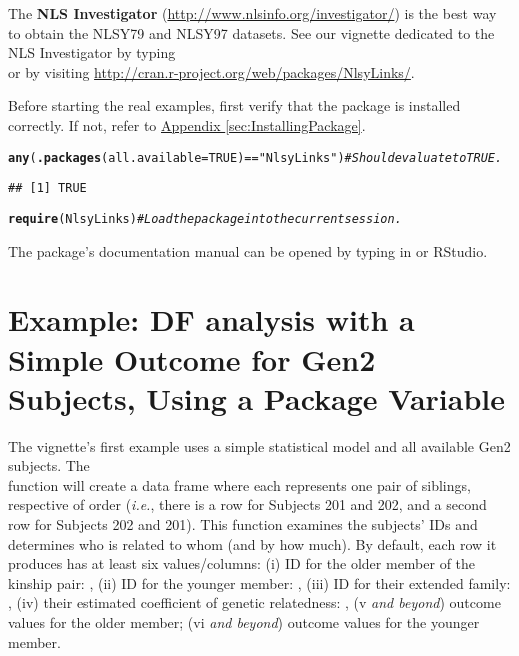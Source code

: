 \documentclass{article}\usepackage[]{graphicx}\usepackage[]{color}
\makeatletter
\newcommand{\hlnum}[1]{\textcolor[rgb]{0.686,0.059,0.569}{#1}}%
\newcommand{\hlstr}[1]{\textcolor[rgb]{0.192,0.494,0.8}{#1}}%
\newcommand{\hlcom}[1]{\textcolor[rgb]{0.678,0.584,0.686}{\textit{#1}}}%
\newcommand{\hlopt}[1]{\textcolor[rgb]{0,0,0}{#1}}%
\newcommand{\hlstd}[1]{\textcolor[rgb]{0.345,0.345,0.345}{#1}}%
\newcommand{\hlkwc}[1]{\textcolor[rgb]{0.333,0.667,0.333}{#1}}%
\newcommand{\hlkwd}[1]{\textcolor[rgb]{0.737,0.353,0.396}{\textbf{#1}}}%
\newenvironment{kframe}{%
 \def\at@end@of@kframe{}%
 \ifinner\ifhmode%
  \def\at@end@of@kframe{\end{minipage}}%
  \begin{minipage}{\columnwidth}%
 \fi\fi%
 \def\FrameCommand##1{\hskip\@totalleftmargin \hskip-\fboxsep
 \colorbox{shadecolor}{##1}\hskip-\fboxsep
     \hskip-\linewidth \hskip-\@totalleftmargin \hskip\columnwidth}%
 \MakeFramed {\advance\hsize-\width
   \@totalleftmargin\z@ \linewidth\hsize
   \@setminipage}}%
 {\par\unskip\endMakeFramed%
 \at@end@of@kframe}
\newenvironment{knitrout}{}{} %
\makeatother
\begin{document}
The \textbf{NLS Investigator}\label{term:NlsInvestigator} (\url{http://www.nlsinfo.org/investigator/}) is the best way to obtain the NLSY79 and NLSY97 datasets.  See our vignette dedicated to the NLS Investigator by typing\\  or by visiting \url{http://cran.r-project.org/web/packages/NlsyLinks/}.

Before starting the real examples, first verify that the  package is installed correctly.  If not, refer to \hyperref[sec:InstallingPackage]{Appendix \ref*{sec:InstallingPackage}}.
\begin{knitrout}
\color{fgcolor}\begin{kframe}
\begin{alltt}
\hlkwd{any}\hlstd{(}\hlkwd{.packages}\hlstd{(}\hlkwc{all.available} \hlstd{=} \hlnum{TRUE}\hlstd{)} \hlopt{==} \hlstr{"NlsyLinks"}\hlstd{)}  \hlcom{#Should evaluate to TRUE.}
\end{alltt}
\begin{verbatim}
## [1] TRUE
\end{verbatim}
\begin{alltt}
\hlkwd{require}\hlstd{(NlsyLinks)}  \hlcom{#Load the package into the current session.}
\end{alltt}


{\ttfamily\noindent\itshape\color{messagecolor}{\#\# Loading required package: NlsyLinks}}\end{kframe}
\end{knitrout}

The package's documentation manual can be opened by typing  in
\R{} or RStudio.


\section{Example: DF analysis with a Simple Outcome for Gen2 Subjects, Using a Package Variable}
The vignette's first example uses a simple statistical model and all available Gen2 subjects.  The \\ function will create a data frame where each represents one pair of siblings, respective of order (\emph{i.e.}, there is a row for Subjects 201 and 202, and a second row for Subjects 202 and 201). This function examines the subjects' IDs and determines who is related to whom (and by how much).  By default, each row it produces has at least six values/columns: (i) ID for the older member of the kinship pair: , (ii) ID for the younger member: , (iii) ID for their extended family: , (iv) their estimated coefficient of genetic relatedness: , (v \emph{and beyond}) outcome values for the older member; (vi \emph{and beyond}) outcome values for the younger member.  
\end{document}
